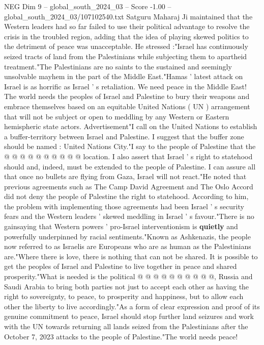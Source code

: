 \begin{textsample}{NEG Dim 9 – global\_south\_2024\_03 – Score -1.00 – global\_south\_2024\_03/107102540.txt}  \label{ex:f9_neg_415}
Satguru Maharaj Ji maintained that the Western leaders had so far failed to use their political advantage to resolve the crisis in the troubled region, adding that the idea of playing skewed politics to the detriment of peace was unacceptable.
He stressed :"Israel has continuously seized tracts of land from the Palestinians while subjecting them to apartheid treatment."The Palestinians are no saints to the sustained and seemingly unsolvable mayhem in the part of the Middle East."Hamas ' latest attack on Israel is as horrific as Israel ' s retaliation.
We need peace in the Middle East!
The world needs the peoples of Israel and Palestine to bury their weapons and embrace themselves based on an equitable United Nations ( UN ) arrangement that will not be subject or open to meddling by any Western or Eastern hemispheric state actors.
Advertisement"I call on the United Nations to establish a buffer-territory between Israel and Palestine.
I suggest that the buffer zone should be named : United Nations City."I say to the people of Palestine that the @ @ @ @ @ @ @ @ @ @ location.
I also assert that Israel ' s right to statehood should and, indeed, must be extended to the people of Palestine.
I can assure all that once no bullets are flying from Gaza, Israel will not react."He noted that previous agreements such as The Camp David Agreement and The Oslo Accord did not deny the people of Palestine the right to statehood.
According to him, the problem with implementing those agreements had been Israel ' s security fears and the Western leaders ' skewed meddling in Israel ' s favour."There is no gainsaying that Western powers ' pro-Israel interventionism is \textbf{quietly} and powerfully underpinned by racial sentiments."Known as Ashkenazis, the people now referred to as Israelis are Europeans who are as human as the Palestinians are."Where there is love, there is nothing that can not be shared.
It is possible to get the peoples of Israel and Palestine to live together in peace and shared prosperity."What is needed is the political @ @ @ @ @ @ @ @ @ @, Russia and Saudi Arabia to bring both parties not just to accept each other as having the right to sovereignty, to peace, to prosperity and happiness, but to allow each other the liberty to live accordingly."As a form of clear expression and proof of its genuine commitment to peace, Israel should stop further land seizures and work with the UN towards returning all lands seized from the Palestinians after the October 7, 2023 attacks to the people of Palestine."The world needs peace!

\end{textsample}
